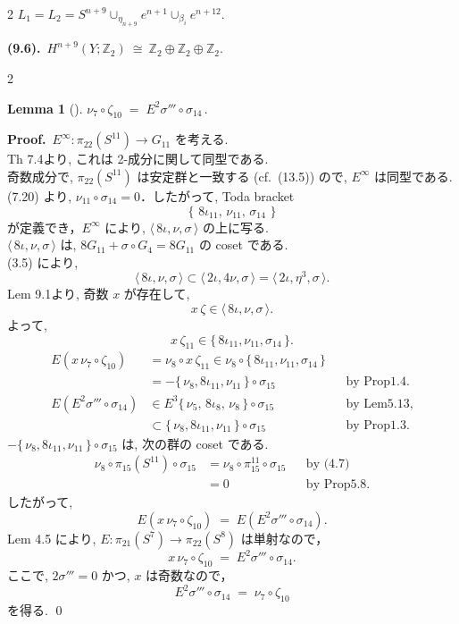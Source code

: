 \documentclass[10pt, leqno]{ltjsarticle}
\newcommand{\Ex}{E}        %
\newcommand{\toda}[1]{\{\,#1\,\}}              %
\newcommand{\todas}[1]{\langle\,#1\,\rangle}
\newcommand{\pit}[2]{\pi_{#1}^{#2}}
\numberwithin{equation}{section}
\theoremstyle{plain}
\newtheorem{lemma}[theorem]{Lemma}
\theoremstyle{definition}
\theoremstyle{remark}
\begin{document}
\begin{paracol}{2}
\noindent
\(L_1 = L_2 = S^{n+9}\cup_{\eta_{n+9}}e^{n+1}\cup_{\beta_i}e^{n+12}\).

\noindent
\textbf{(9.6).}\
\(H^{n+9}(Y;\mathbb Z_2)\ \cong\ \mathbb Z_2\oplus\mathbb Z_2\oplus\mathbb Z_2.\)





\end{paracol}

\begin{paracol}{2}

\begin{lemma}[]\label{lem:9.2}
\qquad\qquad\qquad\qquad\qquad
\(\nu_7\circ \zeta_{10}\;=\;\Ex^{2}\sigma'''\circ \sigma_{14}\, .\)
\end{lemma}

\noindent
\textbf{Proof.}\
$\Ex^\infty:\pi_{22}(S^{11})\to G_{11}$ を考える. \\
Th 7.4より, これは 2-成分に関して同型である.\\
奇数成分で, $\pi_{22}(S^{11})$ は安定群と一致する (cf.\ (13.5)) ので,
\(E^\infty\) は同型である. \\
(7.20) より,  $\nu_{11}\circ \sigma_{14}=0$．したがって,  Toda bracket 
\[
  \toda{\,8\iota_{11},\,\nu_{11},\,\sigma_{14}\,}
\]
が定義でき，$\Ex^\infty$ により, 
$\todas{8\iota,\nu,\sigma}$ の上に写る. \\
\(\todas{8\iota, \nu, \sigma}\)
は, \(8G_{11} + \sigma\circ G_4 = 8G_{11}\) の coset である.\\
(3.5) により, 
\[
\todas{8\iota, \nu, \sigma} 
\subset\todas{2\iota, 4\nu, \sigma}
= \todas{2\iota, \eta^3, \sigma}.
\]
Lem 9.1より, 奇数 $x$ が存在して,
\[
x\,\zeta\in \todas{8\iota,\nu,\sigma}.
\]
よって, 
\[
x\,\zeta_{11}\in \toda{8\iota_{11},\nu_{11},\sigma_{14}}.
\]
\[
\begin{aligned}
  \Ex(x\,\nu_7\circ \zeta_{10})
  & = \nu_8\circ x\,\zeta_{11}
  \in \nu_8\circ \toda{8\iota_{11},\nu_{11},\sigma_{14}}\\
  & = - \toda{\nu_8,8\iota_{11},\nu_{11}} \circ \sigma_{15}
  && \text{by Prop1.4.}\\
  \Ex(\Ex^{2}\sigma'''\circ \sigma_{14})
  & \in \Ex^{3}\toda{\nu_{5},\,8\iota_{8},\,\nu_{8}}\circ \sigma_{15}
  && \text{by Lem5.13,}\\
  & \subset \toda{\nu_8,8\iota_{11},\nu_{11}}\circ \sigma_{15}
  && \text{by Prop1.3.}
\end{aligned}
\]
\(-\toda{\nu_8,8\iota_{11},\nu_{11}}\circ \sigma_{15}\)
は, 次の群の coset である.
\[
\begin{aligned}
  \nu_8\circ \pi_{15}(S^{11})\circ \sigma_{15}
  & = \nu_8\circ \pit{15}{11}\circ\sigma_{15}
  && \text{by (4.7)}\\
  & = 0
  && \text{by Prop5.8.}
\end{aligned}
\]
したがって, 
\[
  \Ex(x\,\nu_7\circ \zeta_{10})
  \;=\; \Ex(\Ex^{2}\sigma'''\circ \sigma_{14}).
\]
Lem 4.5 により, 
$\Ex:\pi_{21}(S^{7})\to \pi_{22}(S^{8})$ は単射なので，
\[
  x\,\nu_7\circ \zeta_{10}\;=\;\Ex^{2}\sigma'''\circ \sigma_{14}.
\]
ここで, $2\sigma'''=0$ かつ, $x$ は奇数なので，
\[
  \Ex^{2}\sigma'''\circ \sigma_{14}
  \;=\;\nu_7\circ \zeta_{10}
\]
を得る. 
\qed


\end{paracol}
\end{document}
